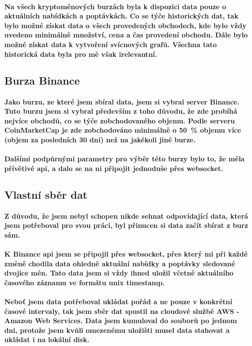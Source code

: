 \documentclass[thesis=B,czech]{FITthesis}[2019/03/21]
\begin{document}
\paragraph{
Na všech kryptoměnových burzách byla k dispozici data pouze o aktuálních nabídkách a poptávkách. Co se týče historických dat, tak bylo možné získat data o všech provedených obchodech, kde bylo vždy uvedeno minimálně množství, cena a čas provedení obchodu. Dále bylo možné získat data k vytvoření svícnových grafů. Všechna tato historická data byla pro mě však irelevantní. 
}
\subsection{Burza Binance}
\paragraph{
Jako burzu, ze které jsem sbíral data, jsem si vybral server Binance. Tuto burzu jsem si vybral především z toho důvodu, že zde probíhá nejvíce obchodů, co se týče zobchodovaného objemu. Podle serveru CoinMarketCap je zde zobchodováno minimálně o 50~\% objemu více (objem za posledních 30 dní) než na jakékoli jiné burze. \cite{coinmarketcap}
}
\paragraph{
Dalšími podpůrnými parametry pro výběr této burzy bylo to, že měla přívětivé api, a dalo se na ni připojit jednoduše přes websocket. \cite{BinanceApi}
}
\subsection{Vlastní sběr dat}
\paragraph{
Z důvodu, že jsem nebyl schopen nikde sehnat odpovídající data, která jsem potřeboval pro svou práci, byl přinucen si data začít sbírat z burz sám.
}
\paragraph{
K Binance api jsem se připojil přes websocket, přes který mi při každé změně chodila data ohledně aktuální nabídky a poptávky sledované dvojice měn. Tato data jsem si vždy ihned uložil včetně aktuálního časového záznamu ve formátu unix timestamp.\cite{BinanceApi}
}
\paragraph{
Neboť jsem data potřeboval ukládat pořád a ne pouze v konkrétní časové intervaly, tak jsem sběr dat spustil na cloudové službě AWS - Amazon Web Services. Data jsem kumuloval do souborů po jednom dni, protože jsem kvůli omezenému uložišti musel data stahovat a ukládat i na lokální disk.
}
\end{document}
